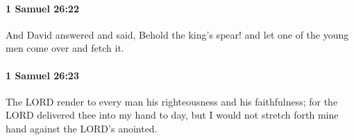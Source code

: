 		\paragraph{1 Samuel 26:22} %
			\label{1SAMUEL-26-22}

			And David answered and said, Behold the king’s spear! and let one of the young men come over and fetch it.


		\paragraph{1 Samuel 26:23} %
			\label{1SAMUEL-26-23}

			The LORD render to every man his righteousness and his faithfulness; for the LORD delivered thee into my hand to day, but I would not stretch forth mine hand against the LORD’s anointed.


